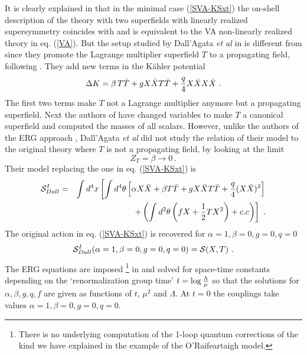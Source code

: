 \documentclass[11pt]{article}
\newcommand{\be}{\begin{equation}}
\newcommand{\ee}{\end{equation}}
\newcommand{\bea}{\begin{eqnarray}}
\newcommand{\eea}{\end{eqnarray}}
\def\K{K{\"a}hler }
\newcommand{\rf}[1]{(\ref{#1})}
\def\be{\begin{equation}}
\def\ee{\end{equation}}
\def\bea{\begin{eqnarray}}
\def\eea{\end{eqnarray}}
\newcommand{\lp}{\left(}
\newcommand{\rp}{\right)}
\newcommand{\ls}{\left[}
\newcommand{\rs}{\right]}
\begin{document}
It is clearly explained in \cite{Komargodski:2009rz} that in the minimal case \rf{SVA-KSxt} the on-shell description of the theory with two superfields with linearly realized supersymmetry coincides with \cite{Rocek:1978nb} and is equivalent to the VA non-linearly realized theory in eq. \rf{VA}. 
But the setup studied by Dall'Agata {\it et al} in \cite{DallAgata:2022abm} is different from \cite{Komargodski:2009rz} since they promote the Lagrange multiplier superfield $T$ to a propagating field, following  \cite{Jaeckel:2002rm}. They add new terms in the \K potential 
\be
\Delta K = \beta \, T\bar T + g X\bar X T\bar T + {q\over 4} X\bar X X\bar X  \ .
\label{add}\ee
The first two terms make $T$ not a Lagrange multiplier anymore but a propagating superfield. Next the authors of \cite{DallAgata:2022abm} have changed variables to make $T$ a canonical superfield and computed the masses of all scalars. However, unlike the authors of the ERG approach \cite{Wetterich:1992yh}, 
Dall'Agata {\it et al} did not study the relation of their model to the original theory where $T$ is not a propagating field,  by looking at the limit 
\be
Z_T= \beta  \to 0 \ .
\label{4f}\ee 
Their model replacing the one in eq. \rf{SVA-KSxt} is 
\bea
{\cal S}_{Dall}^I &=& \int d^4  x\ls\int d^4 \theta  \ls \alpha  X  {\bar X} +   \beta  T  {\bar T} + g X\bar X T\bar T + {q\over 4}( X\bar X)^2\rs \right.\cr
&&\qquad\quad \ \left.+  \lp\int d^2 \theta \lp fX + {1\over 2} TX^2\rp + c.c\rp\rs \ .
\label{SFar0}\eea
The original action in eq. \rf{SVA-KSxt} is recovered for $\alpha=1, \beta=0, g=0, q=0$
\be
{\cal S}_{Dall}^I  (\alpha=1, \beta=0, g=0, q=0)=  {\cal S} (X, T) \ .
\label{DallVA}\ee 
The  ERG equations are imposed  \footnote{There is no underlying computation of the 1-loop quantum corrections of the kind we have explained in the example of the O'Raifeartaigh model. } in \cite{DallAgata:2022abm} and solved for space-time constants depending on the `renormalization group time' $t= \log {\Lambda\over \mu}$ so that the solutions for $\alpha, \beta, g, q, f$ are given as functions of $t$, $\mu^2$ and $\Lambda$. At $t=0$ the couplings take values $\alpha=1, \beta=0, g=0, q=0$.
 
\end{document}
